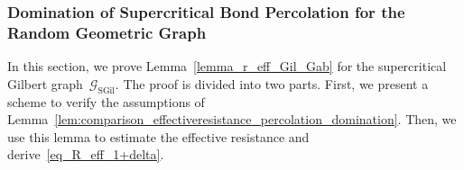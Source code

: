 \documentclass[a4paper,11pt]{article}
\theoremstyle{definition}
\begin{document}



\subsubsection{Domination of Supercritical Bond Percolation for the Random Geometric Graph}\label{ss_dom_rgg}
In this section, we prove Lemma~\ref{lemma_r_eff_Gil_Gab} for the supercritical Gilbert graph~$\mathcal G_\mathrm{SGil}$. The proof is divided into two parts. First, we present a scheme to verify the assumptions of Lemma~\ref{lem:comparison_effectiveresistance_percolation_domination}. Then, we use this lemma to estimate the effective resistance and derive~\eqref{eq_R_eff_1+delta}.\\
\end{document}
